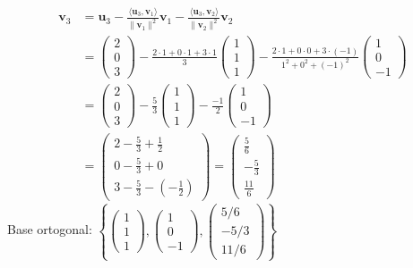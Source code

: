 \begin{myproof}
\begin{align*}
\mathbf{v}_3 &= \mathbf{u}_3 - \frac{\langle \mathbf{u}_3, \mathbf{v}_1 \rangle}{\|\mathbf{v}_1\|^2} \mathbf{v}_1 - \frac{\langle \mathbf{u}_3, \mathbf{v}_2 \rangle}{\|\mathbf{v}_2\|^2} \mathbf{v}_2 \\
&= \begin{pmatrix} 2 \\ 0 \\ 3 \end{pmatrix} - \frac{2\cdot1 + 0\cdot1 + 3\cdot1}{3} \begin{pmatrix} 1 \\ 1 \\ 1 \end{pmatrix} - \frac{2\cdot1 + 0\cdot0 + 3\cdot(-1)}{1^2+0^2+(-1)^2} \begin{pmatrix} 1 \\ 0 \\ -1 \end{pmatrix} \\
&= \begin{pmatrix} 2 \\ 0 \\ 3 \end{pmatrix} - \frac{5}{3} \begin{pmatrix} 1 \\ 1 \\ 1 \end{pmatrix} - \frac{-1}{2} \begin{pmatrix} 1 \\ 0 \\ -1 \end{pmatrix} \\
&= \begin{pmatrix} 2 - \frac{5}{3} + \frac{1}{2} \\ 0 - \frac{5}{3} + 0 \\ 3 - \frac{5}{3} - (-\frac{1}{2}) \end{pmatrix} = \begin{pmatrix} \frac{5}{6} \\ -\frac{5}{3} \\ \frac{11}{6} \end{pmatrix}
\end{align*}
Base ortogonal: $\left\{ \begin{pmatrix} 1 \\ 1 \\ 1 \end{pmatrix}, \begin{pmatrix} 1 \\ 0 \\ -1 \end{pmatrix}, \begin{pmatrix} 5/6 \\ -5/3 \\ 11/6 \end{pmatrix} \right\}$


\end{myproof}
